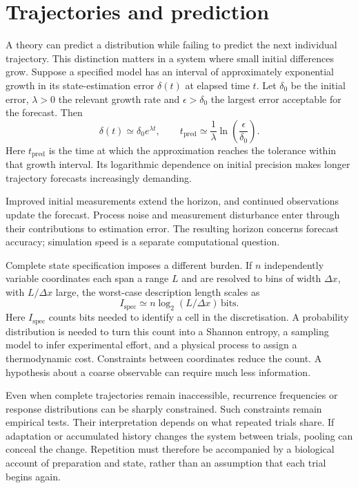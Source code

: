 \documentclass[10pt,twocolumn]{article}
\newcommand{\bits}{\,\mathrm{bits}}
\begin{document}
\section{Trajectories and prediction}

A theory can predict a distribution while failing to predict the next individual trajectory. This distinction matters in a system where small initial differences grow. Suppose a specified model has an interval of approximately exponential growth in its state-estimation error \(\delta(t)\) at elapsed time \(t\). Let \(\delta_0\) be the initial error, \(\lambda>0\) the relevant growth rate and \(\epsilon>\delta_0\) the largest error acceptable for the forecast. Then
\begin{equation}
\delta(t)\simeq\delta_0 e^{\lambda t},
\qquad
t_{\mathrm{pred}}\simeq
\frac{1}{\lambda}\ln\!\left(\frac{\epsilon}{\delta_0}\right).
\label{eq:horizon}
\end{equation}
Here \(t_{\mathrm{pred}}\) is the time at which the approximation reaches the tolerance within that growth interval. Its logarithmic dependence on initial precision makes longer trajectory forecasts increasingly demanding.

Improved initial measurements extend the horizon, and continued observations update the forecast. Process noise and measurement disturbance enter through their contributions to estimation error. The resulting horizon concerns forecast accuracy; simulation speed is a separate computational question.

Complete state specification imposes a different burden. If \(n\) independently variable coordinates each span a range \(L\) and are resolved to bins of width \(\Delta x\), with \(L/\Delta x\) large, the worst-case description length scales as
\begin{equation}
I_{\mathrm{spec}}\simeq n\log_2(L/\Delta x)\bits.
\label{eq:specification}
\end{equation}
Here \(I_{\mathrm{spec}}\) counts bits needed to identify a cell in the discretisation. A probability distribution is needed to turn this count into a Shannon entropy, a sampling model to infer experimental effort, and a physical process to assign a thermodynamic cost. Constraints between coordinates reduce the count. A hypothesis about a coarse observable can require much less information.

Even when complete trajectories remain inaccessible, recurrence frequencies or response distributions can be sharply constrained. Such constraints remain empirical tests. Their interpretation depends on what repeated trials share. If adaptation or accumulated history changes the system between trials, pooling can conceal the change. Repetition must therefore be accompanied by a biological account of preparation and state, rather than an assumption that each trial begins again.
\end{document}

